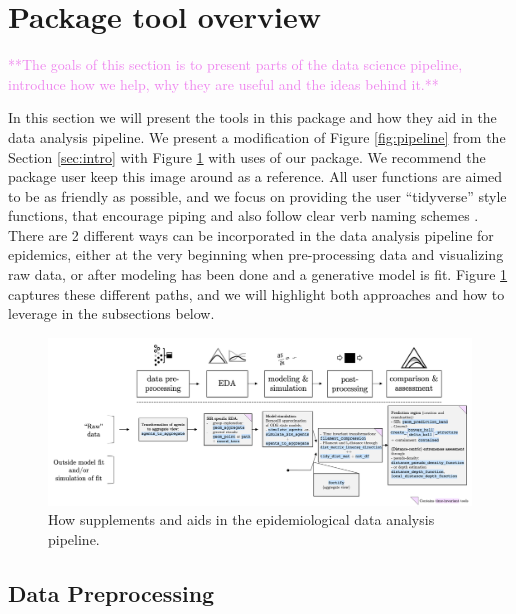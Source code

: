 \documentclass[
  shortnames]{jss}
\begin{document}
\section[Package overview]{Package tool overview}\label{sec:overview}

\textcolor{violet}{**The goals of this section is to present parts of the data science pipeline, introduce how we help, why they are useful and the ideas behind it.**}

In this section we will present the tools in this package and how they
aid in the data analysis pipeline. We present a modification of Figure
\ref{fig:pipeline} from the Section \ref{sec:intro} with Figure
\ref{fig:pipeline2} with uses of our package. We recommend the package
user keep this image around as a reference. All user functions are aimed
to be as friendly as possible, and we focus on providing the user
``tidyverse'' style functions, that encourage piping and also follow
clear verb naming schemes \citep{Wickham2019}. There are 2 different
ways  can be incorporated in the data analysis pipeline
for epidemics, either at the very beginning when pre-processing data and
visualizing raw data, or after modeling has been done and a generative
model is fit. Figure \ref{fig:pipeline2} captures these different paths,
and we will highlight both approaches and how to leverage
 in the subsections below.

\begin{figure}[!ht]
    \centering
    \includegraphics[width = 1\textwidth]{images/pipeline2.png}
    \caption{How  supplements and aids in the epidemiological data analysis pipeline.}
    \label{fig:pipeline2}
\end{figure}

\hypertarget{data-preprocessing}{%
\subsection{Data Preprocessing}\label{data-preprocessing}}
\end{document}
